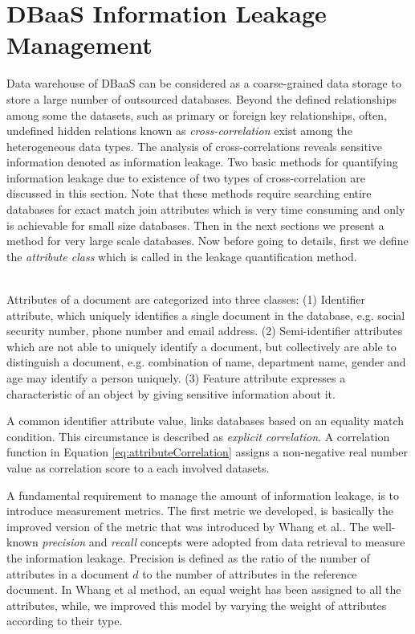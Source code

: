 \section{DBaaS Information Leakage Management}
\label{LeakagePreventionSection}
Data warehouse of DBaaS can be considered as a coarse-grained data storage to store a large number of outsourced databases. Beyond the defined relationships among some the datasets, such as primary or foreign key relationships, often, undefined hidden relations known as \emph{cross-correlation} exist among the heterogeneous data types. The analysis of cross-correlations reveals sensitive information denoted as information leakage. Two basic methods for quantifying information leakage due to existence of two types of cross-correlation are discussed in this section. Note that these methods require searching entire databases for exact match join attributes which is very time consuming and only is achievable for small size databases. Then in the next sections we present a method for very large scale databases.  
Now before going to details, first we define the \emph{attribute class} which is called in the leakage quantification method.

\begin{definition} \hfill \\
\label{def:attributesClasses}
Attributes of a document are categorized into three classes: (1) Identifier attribute, which uniquely identifies a single document in the database, e.g. social security number, phone number and email address. (2) Semi-identifier attributes which are not able to uniquely identify a document, but collectively are able to distinguish a document, e.g. combination of name, department name, gender and age may identify a person uniquely. (3) Feature attribute expresses a characteristic of an object by giving sensitive information about it.
\end{definition} 

 A common identifier attribute value, links databases based on an equality match condition. This circumstance is described as \emph{explicit correlation}. A correlation function in Equation \ref{eq:attributeCorrelation} assigns a non-negative real number value as correlation score to a each involved datasets. 

A fundamental requirement to manage the amount of information leakage,  is to introduce measurement metrics. The first metric we developed, is basically the improved version of the metric that was introduced by Whang et al.\cite{whang2010managing}. The well-known \emph{precision} and \emph{recall} concepts were adopted from data retrieval to measure the information leakage. Precision is defined as the ratio of the number of attributes in a document $d$ to the number of attributes in the reference document. In Whang et al method, an equal weight has been assigned to all the attributes, while, we improved this model by varying  the weight of attributes according to their type.\\

